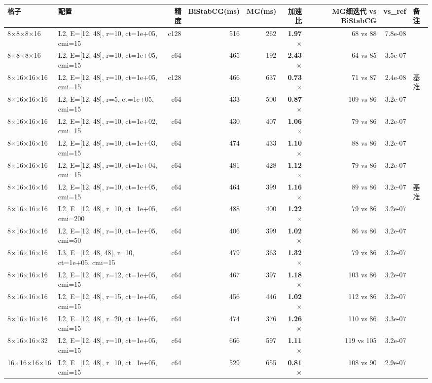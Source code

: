 \begin{longtable}{llrrrrrrl}
\toprule
格子 & 配置 & 精度 & BiStabCG(ms) & MG(ms) & 加速比 & MG细迭代 vs BiStabCG & vs\_ref & 备注 \\
\midrule
\endhead
8×8×8×16 & L2, E=[12, 48], r=10, ct=1e+05, cmi=15 & c128 & 516 & 262 & \textbf{1.97$\times$} & 68 vs 88 & 7.8e-08 &  \\
8×8×8×16 & L2, E=[12, 48], r=10, ct=1e+05, cmi=15 & c64 & 465 & 192 & \textbf{2.43$\times$} & 64 vs 85 & 3.5e-07 &  \\
8×16×16×16 & L2, E=[12, 48], r=10, ct=1e+05, cmi=15 & c128 & 466 & 637 & \textbf{0.73$\times$} & 71 vs 87 & 2.4e-08 & 基准 \\
8×16×16×16 & L2, E=[12, 48], r=5, ct=1e+05, cmi=15 & c64 & 433 & 500 & \textbf{0.87$\times$} & 109 vs 86 & 3.2e-07 &  \\
8×16×16×16 & L2, E=[12, 48], r=10, ct=1e+02, cmi=15 & c64 & 430 & 407 & \textbf{1.06$\times$} & 79 vs 86 & 3.2e-07 &  \\
8×16×16×16 & L2, E=[12, 48], r=10, ct=1e+03, cmi=15 & c64 & 474 & 433 & \textbf{1.10$\times$} & 88 vs 86 & 3.2e-07 &  \\
8×16×16×16 & L2, E=[12, 48], r=10, ct=1e+04, cmi=15 & c64 & 481 & 428 & \textbf{1.12$\times$} & 79 vs 86 & 3.2e-07 &  \\
8×16×16×16 & L2, E=[12, 48], r=10, ct=1e+05, cmi=15 & c64 & 464 & 399 & \textbf{1.16$\times$} & 89 vs 86 & 3.2e-07 & 基准 \\
8×16×16×16 & L2, E=[12, 48], r=10, ct=1e+05, cmi=200 & c64 & 488 & 400 & \textbf{1.22$\times$} & 79 vs 86 & 3.2e-07 &  \\
8×16×16×16 & L2, E=[12, 48], r=10, ct=1e+05, cmi=50 & c64 & 406 & 399 & \textbf{1.02$\times$} & 86 vs 86 & 3.2e-07 &  \\
8×16×16×16 & L3, E=[12, 48, 48], r=10, ct=1e+05, cmi=15 & c64 & 479 & 363 & \textbf{1.32$\times$} & 79 vs 86 & 3.2e-07 &  \\
8×16×16×16 & L2, E=[12, 48], r=12, ct=1e+05, cmi=15 & c64 & 467 & 397 & \textbf{1.18$\times$} & 103 vs 86 & 3.2e-07 &  \\
8×16×16×16 & L2, E=[12, 48], r=15, ct=1e+05, cmi=15 & c64 & 456 & 446 & \textbf{1.02$\times$} & 112 vs 86 & 3.2e-07 &  \\
8×16×16×16 & L2, E=[12, 48], r=20, ct=1e+05, cmi=15 & c64 & 474 & 376 & \textbf{1.26$\times$} & 110 vs 86 & 3.3e-07 &  \\
8×16×16×32 & L2, E=[12, 48], r=10, ct=1e+05, cmi=15 & c64 & 666 & 597 & \textbf{1.11$\times$} & 119 vs 105 & 3.2e-07 &  \\
16×16×16×16 & L2, E=[12, 48], r=10, ct=1e+05, cmi=15 & c64 & 529 & 655 & \textbf{0.81$\times$} & 108 vs 90 & 2.9e-07 &  \\
\bottomrule
\end{longtable}
